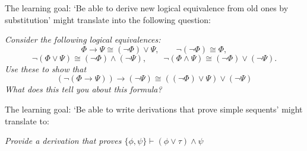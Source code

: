 \documentclass{article}[12pt]
\begin{document}
The learning goal: `Be able to derive new logical equivalence from old ones by substitution' might translate into the following question:

\emph{Consider the following logical equivalences: 
$$\Phi \rightarrow \Psi \cong (\neg \Phi) \vee \Psi, \qquad
 \neg (\neg \Phi) \cong \Phi,  $$
 $$\neg (\Phi \vee \Psi) \cong (\neg \Phi) \wedge (\neg \Psi), \qquad \neg (\Phi \wedge \Psi) \cong (\neg \Phi) \vee (\neg \Psi).$$ 
 Use these to show that
$$ (\neg (\Phi \rightarrow \Psi)) \rightarrow (\neg \Psi) \cong ((\neg \Phi) \vee \Psi) \vee (\neg \Psi) $$ 
What does this tell you about this formula?
}

The learning goal: `Be able to write derivations that prove simple sequents' might translate to:

\emph{Provide a derivation that proves $\{ \phi, \psi \} \vdash (\phi \vee \tau) \wedge \psi$}
\end{document}
